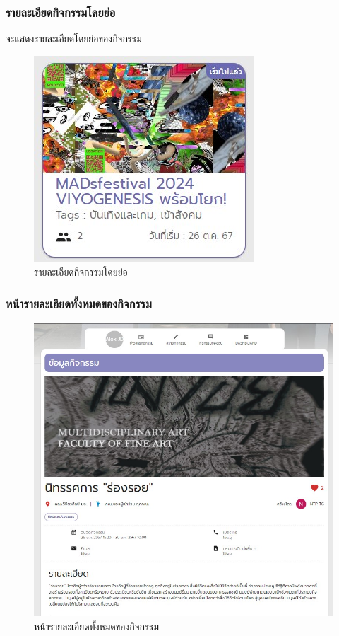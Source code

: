 \subsubsection{รายละเอียดกิจกรรมโดยย่อ}
จะแสดงรายละเอียดโดยย่อของกิจกรรม
\begin{figure}[H]
\begin{center}
\includegraphics[scale=0.8]{public/act-mini.jpg}
\end{center}
\caption[รายละเอียดกิจกรรมโดยย่อ]{รายละเอียดกิจกรรมโดยย่อ}
\label{fig:event-box}
\end{figure}

\subsubsection{หน้ารายละเอียดทั้งหมดของกิจกรรม}
\begin{figure}[H]
\begin{center}
\includegraphics[scale=0.5]{public/act-detail.jpg}
\end{center}
\caption[หน้ารายละเอียดทั้งหมดของกิจกรรม]{หน้ารายละเอียดทั้งหมดของกิจกรรม}
\label{fig:event-detail}
\end{figure}
\clearpage

